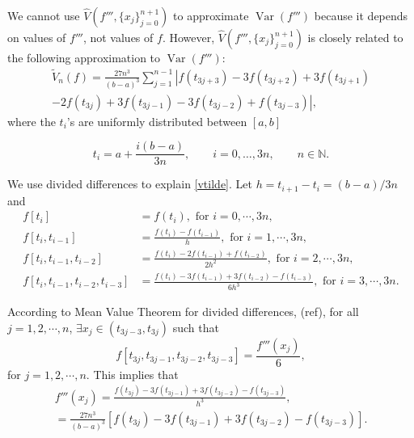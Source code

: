 \documentclass{iitthesis}
\DeclareMathOperator{\Var}{Var}
\theoremstyle{definition}
\theoremstyle{remark}
\begin{document}
We cannot use $\widehat{V}(f''',\{x_j\}_{j=0}^{n+1})$ to approximate $\Var{(f''')}$ because it depends on values of $f'''$, not values of $f$. However, $\widehat{V}(f''',\{x_j\}_{j=0}^{n+1})$ is closely related to the following approximation to $\Var{(f''')}$:
\begin{multline}\label{vtilde}
\widetilde{V}_n(f)=\frac{27n^3}{(b-a)^3}\sum_{j=1}^{n-1}\left|f(t_{3j+3})-3f(t_{3j+2})+3f(t_{3j+1})\right.\\\left.-2f(t_{3j})+3f(t_{3j-1})-3f(t_{3j-2})+f(t_{3j-3})\right|,
\end{multline}
where the $t_{i}$'s are uniformly distributed between $[a,b]$

\begin{equation}\label{datapoints}
t_i=a+\frac{i(b-a)}{3n}, \qquad i=0, \ldots, 3n, \qquad n\in\mathbb{N}.
\end{equation}

We use divided differences to explain \eqref{vtilde}. Let $h=t_{i+1}-t_{i}=(b-a)/3n$ and
\begin{align*}
  f[t_{i}]&=f(t_{i}), \text{ for } i=0,\cdots, 3n,\\
  f[t_{i},t_{i-1}]&=\frac{f(t_{i})-f(t_{i-1})}{h},\text{ for } i=1, \cdots, 3n,\\
  f[t_{i},t_{i-1},t_{i-2}]&=\frac{f(t_{i})-2f(t_{i-1})+f(t_{i-2})}{2h^2},\text{ for } i=2, \cdots, 3n,\\
  f[t_{i},t_{i-1},t_{i-2},t_{i-3}]&=\frac{f(t_{i})-3f(t_{i-1})+3f(t_{i-2})-f(t_{i-3})}{6h^3}, \text{ for } i=3, \cdots, 3n.
\end{align*}

According to Mean Value Theorem for divided differences, (ref), for all $j=1,2,\cdots,n$, $\exists x_j\in (t_{3j-3},t_{3j})$ such that
\begin{equation*}
    f[t_{3j},t_{3j-1},t_{3j-2},t_{3j-3}]=\frac{f'''(x_j)}{6},
\end{equation*}
for $j = 1, 2, \cdots, n.$ This implies that
\begin{multline}\label{vtileqftriprime}
  f'''(x_j)=\frac{f(t_{3j})-3f(t_{3j-1})+3f(t_{3j-2})-f(t_{3j-3})}{h^3},\\=\frac{27n^3}{(b-a)^3}[f(t_{3j})-3f(t_{3j-1})+3f(t_{3j-2})-f(t_{3j-3})].
\end{multline}
\end{document}
